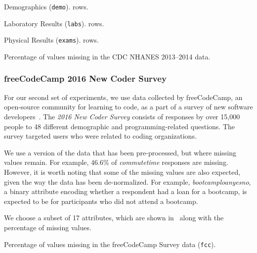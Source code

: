 \begin{table}
  \centering
  \begin{subtable}{0.3\textwidth}
    \centering
    
    \caption{Demographics (\texttt{demo}). \demorows{} rows.}
  \end{subtable}\quad\begin{subtable}{0.3\textwidth}
    \centering
    
    \caption{Laboratory Results (\texttt{labs}). \labexrows{} rows.}
  \end{subtable}\quad\begin{subtable}{0.3\textwidth}
    \centering
    
    \caption{Physical Results (\texttt{exams}). \labexrows{} rows.}
  \end{subtable}
  \caption{Percentage of values missing in the CDC NHANES 2013--2014 data.}\label{table:nhanes-description} 
\end{table}

\subsubsection{freeCodeCamp 2016 New Coder Survey}
For our second set of experiments, we use data collected by freeCodeCamp, an open-source
community for learning to code, as a part of a survey of new software
developers~\cite{fcc-data}.  The \textit{2016 New Coder Survey} consists of responses by
over 15,000 people to 48 different demographic and programming-related questions.  The
survey targeted users who were related to coding organizations.

We use a version of the data that has been pre-processed, but where missing values remain.
For example, 46.6\% of \textit{commutetime} responses are missing. However, it is worth
noting that some of the missing values are also expected, given the way the data has been
de-normalized. For example, \textit{bootcamploanyesno}, a binary attribute encoding whether
a respondent had a loan for a bootcamp, is expected to be \nullv{} for participants who did not
attend a bootcamp.

We choose a subset of 17 attributes, which are shown in~ along
with the percentage of missing values.

\begin{table}
  \centering
  
  \caption{Percentage of values missing in the freeCodeCamp Survey data (\texttt{fcc}).}\label{table:fcc-description} 
\end{table}

